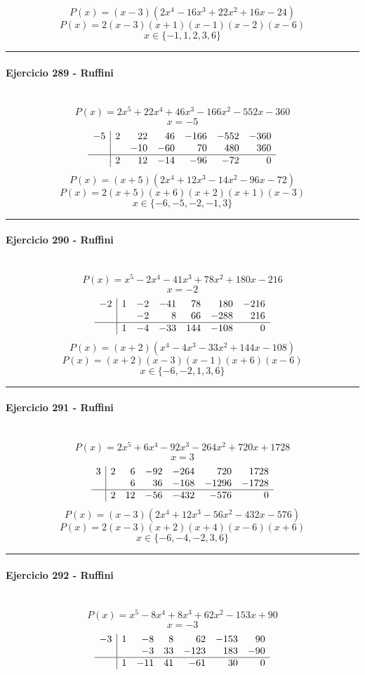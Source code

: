\documentclass[10pt,a4paper]{article}
\newcommand{\res}[1]{\paragraph{#1}\mbox{}\\[-1.2em]}
\begin{document}
\[ P(x)=(x-3)(2 x^{4} - 16 x^{3} + 22 x^{2} + 16 x - 24) \]
\[ P(x)=2(x-3)(x+1)(x-1)(x-2)(x-6) \]
\[ \boxed{x\in\{-1,1,2,3,6\}} \]
\vspace{1mm}\hrule\vspace{2mm}
\res{Ejercicio 289 - Ruffini}
\[ P(x)=2 x^{5} + 22 x^{4} + 46 x^{3} - 166 x^{2} - 552 x - 360 \]
\[ x=-5 \]
\[\begin{array}{r|rrrrrr}-5 & 2 & 22 & 46 & -166 & -552 & -360\\  &  & -10 & -60 & 70 & 480 & 360\\\hline  & 2 & 12 & -14 & -96 & -72 & 0\end{array}\]
\[ P(x)=(x+5)(2 x^{4} + 12 x^{3} - 14 x^{2} - 96 x - 72) \]
\[ P(x)=2(x+5)(x+6)(x+2)(x+1)(x-3) \]
\[ \boxed{x\in\{-6,-5,-2,-1,3\}} \]
\vspace{1mm}\hrule\vspace{2mm}
\res{Ejercicio 290 - Ruffini}
\[ P(x)=x^{5} - 2 x^{4} - 41 x^{3} + 78 x^{2} + 180 x - 216 \]
\[ x=-2 \]
\[\begin{array}{r|rrrrrr}-2 & 1 & -2 & -41 & 78 & 180 & -216\\  &  & -2 & 8 & 66 & -288 & 216\\\hline  & 1 & -4 & -33 & 144 & -108 & 0\end{array}\]
\[ P(x)=(x+2)(x^{4} - 4 x^{3} - 33 x^{2} + 144 x - 108) \]
\[ P(x)=(x+2)(x-3)(x-1)(x+6)(x-6) \]
\[ \boxed{x\in\{-6,-2,1,3,6\}} \]
\vspace{1mm}\hrule\vspace{2mm}
\res{Ejercicio 291 - Ruffini}
\[ P(x)=2 x^{5} + 6 x^{4} - 92 x^{3} - 264 x^{2} + 720 x + 1728 \]
\[ x=3 \]
\[\begin{array}{r|rrrrrr}3 & 2 & 6 & -92 & -264 & 720 & 1728\\  &  & 6 & 36 & -168 & -1296 & -1728\\\hline  & 2 & 12 & -56 & -432 & -576 & 0\end{array}\]
\[ P(x)=(x-3)(2 x^{4} + 12 x^{3} - 56 x^{2} - 432 x - 576) \]
\[ P(x)=2(x-3)(x+2)(x+4)(x-6)(x+6) \]
\[ \boxed{x\in\{-6,-4,-2,3,6\}} \]
\vspace{1mm}\hrule\vspace{2mm}
\res{Ejercicio 292 - Ruffini}
\[ P(x)=x^{5} - 8 x^{4} + 8 x^{3} + 62 x^{2} - 153 x + 90 \]
\[ x=-3 \]
\[\begin{array}{r|rrrrrr}-3 & 1 & -8 & 8 & 62 & -153 & 90\\  &  & -3 & 33 & -123 & 183 & -90\\\hline  & 1 & -11 & 41 & -61 & 30 & 0\end{array}\]
\end{document}

